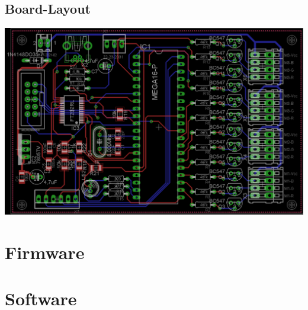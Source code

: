 \documentclass[12pt,a4paper]{article}
\numberwithin{equation}{section}
\numberwithin{table}{subsection}
\theoremstyle{mdef}
\begin{document}
\subsection{Board-Layout}
\includegraphics{images/board-large.png}
\clearpage


\section{Firmware}
\clearpage


\section{Software}
\clearpage

\end{document}
